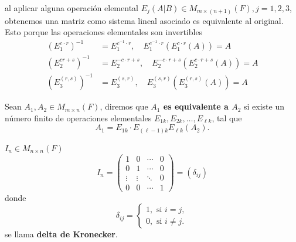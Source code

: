\documentclass[12pt,a4paper]{book}
\begin{document}
    al aplicar alguna operación elemental $E_{j}(A|B)\in M_{m\times(n+1)}(F),j=1,2,3$, obtenemos una matriz
    como sistema lineal asociado es equivalente al original. Esto porque las operaciones elementales son invertibles
    \begin{align*}
        (E_{1}^{c\cdot r})^{-1}&=E_{1}^{c^{-1}\cdot r},\quad E_{1}^{c^{-1}\cdot r}(E_{1}^{c\cdot r}(A))=A\\
        (E_{2}^{cr+s})^{-1}&=E_{2}^{-c\cdot r+s},\quad E_{2}^{-c\cdot r+s}(E_{2}^{c\cdot r+s}(A))=A\\
        (E_{3}^{(r,s)})^{-1}&=E_{3}^{(s,r)},\quad E_{3}^{(s,r)}(E_{3}^{(r,s)}(A))=A
    \end{align*}

    \vspace{0.4cm}

    \begin{definicion}
    \label{def:5}
        Sean $A_{1},A_{2}\in M_{m\times n}(F)$, diremos que \textbf{$A_{1}$ es equivalente a $A_{2}$} si existe un número
        finito de operaciones elementales $E_{1k},E_{2k},\dots,E_{\ell k}$, tal que
        \begin{equation*}
            A_{1}=E_{1k}\cdot E_{(\ell-1)k}E_{\ell k}(A_{2}).
        \end{equation*}
    \end{definicion}

    \begin{ejemplo}
    \label{ej:6}
        $I_{n}\in M_{n\times n}(F)$
        \begin{equation*}
            I_{n}=
            \begin{pmatrix}
                1 & 0 & \cdots & 0\\
                0 & 1 & \cdots & 0\\
                \vdots & \vdots & \ddots&  0\\
                0 & 0 & \cdots & 1
            \end{pmatrix}
            =(\delta_{ij})
        \end{equation*}
        donde
        \begin{equation*}
            \delta_{ij}=
            \begin{cases}
                1,\text{ si }i=j,\\
                0,\text{ si }i\neq j.
            \end{cases}
        \end{equation*}
        se llama \textbf{delta de Kronecker}.
    \end{ejemplo}
    
\end{document}
